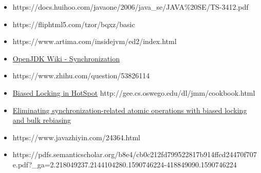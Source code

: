 \documentclass[12pt]{article}
\begin{document}
\begin{itemize}
\tightlist
\item
  https://docs.huihoo.com/javaone/2006/java\_se/JAVA\%20SE/TS-3412.pdf
\item
  https://fliphtml5.com/tzor/bqxz/basic
\item
  https://www.artima.com/insidejvm/ed2/index.html
\item
  \href{https://wiki.openjdk.java.net/display/HotSpot/Synchronization}{OpenJDK Wiki - Synchronization}
\item
  https://www.zhihu.com/question/53826114
\item
  \href{https://blogs.oracle.com/dave/biased-locking-in-hotspot}{Biased Locking in HotSpot} http://gee.cs.oswego.edu/dl/jmm/cookbook.html
\item
  \href{https://www.semanticscholar.org/paper/Eliminating-synchronization-related-atomic-with-and-Russell-Detlefs/356a2d9859520c9161d67828d45e758a24ecce20}{Eliminating synchronization-related atomic operations with biased locking and bulk rebiasing}
\item
  https://www.javazhiyin.com/24364.html
\item
  https://pdfs.semanticscholar.org/b8e4/cb0c212fd799522817b914ffcd24470f707e.pdf?\_ga=2.218049237.2144104280.1590746224-418849090.1590746224
\end{itemize}
\end{document}
